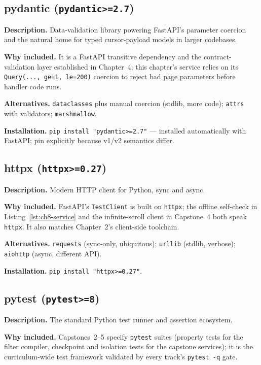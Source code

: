 \subsection{pydantic (\texttt{pydantic>=2.7})}

\textbf{Description.} Data-validation library \cite{pydanticdocs} powering
FastAPI's parameter coercion and the natural home for typed cursor-payload
models in larger codebases.

\textbf{Why included.} It is a FastAPI transitive dependency and the
contract-validation layer established in Chapter~4; this chapter's service
relies on its \texttt{Query(..., ge=1, le=200)} coercion to reject bad page
parameters before handler code runs.

\textbf{Alternatives.} \texttt{dataclasses} plus manual coercion (stdlib,
more code); \texttt{attrs} with validators; \texttt{marshmallow}.

\textbf{Installation.} \texttt{pip install "pydantic>=2.7"} --- installed
automatically with FastAPI; pin explicitly because v1/v2 semantics differ.

\subsection{httpx (\texttt{httpx>=0.27})}

\textbf{Description.} Modern HTTP client for Python, sync and async.

\textbf{Why included.} FastAPI's \texttt{TestClient} is built on
\texttt{httpx}; the offline self-check in
Listing~\ref{lst:ch8-service} and the infinite-scroll client in Capstone~4
both speak \texttt{httpx}. It also matches Chapter~2's client-side
toolchain.

\textbf{Alternatives.} \texttt{requests} (sync-only, ubiquitous);
\texttt{urllib} (stdlib, verbose); \texttt{aiohttp} (async, different API).

\textbf{Installation.} \texttt{pip install "httpx>=0.27"}.

\subsection{pytest (\texttt{pytest>=8})}

\textbf{Description.} The standard Python test runner and assertion
ecosystem.

\textbf{Why included.} Capstones~2--5 specify \texttt{pytest} suites
(property tests for the filter compiler, checkpoint and isolation tests for
the capstone services); it is the curriculum-wide test framework validated
by every track's \texttt{pytest -q} gate.

